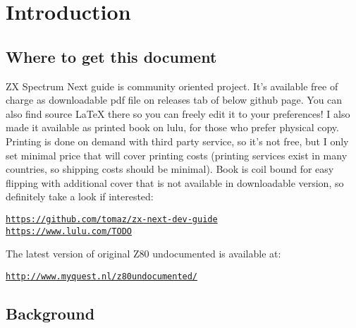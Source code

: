\documentclass[12pt,twoside,openright,a4paper]{book}
\begin{document}
\chapter{Introduction}

\minitoc


\section{Where to get this document}

ZX Spectrum Next guide is community oriented project. It's available free of charge as downloadable pdf file on releases tab of below github page. You can also find source {\LaTeX} there so you can freely edit it to your preferences! I also made it available as printed book on lulu, for those who prefer physical copy. Printing is done on demand with third party service, so it's not free, but I only set minimal price that will cover printing costs (printing services exist in many countries, so shipping costs should be minimal). Book is coil bound for easy flipping with additional cover that is not available in downloadable version, so definitely take a look if interested:

{\tt \url{https://github.com/tomaz/zx-next-dev-guide}}\\
{\tt \url{https://www.lulu.com/TODO}}

The latest version of original Z80 undocumented is available at:

{\tt \url{http://www.myquest.nl/z80undocumented/}}


\pagebreak
\section{Background}
\end{document}
